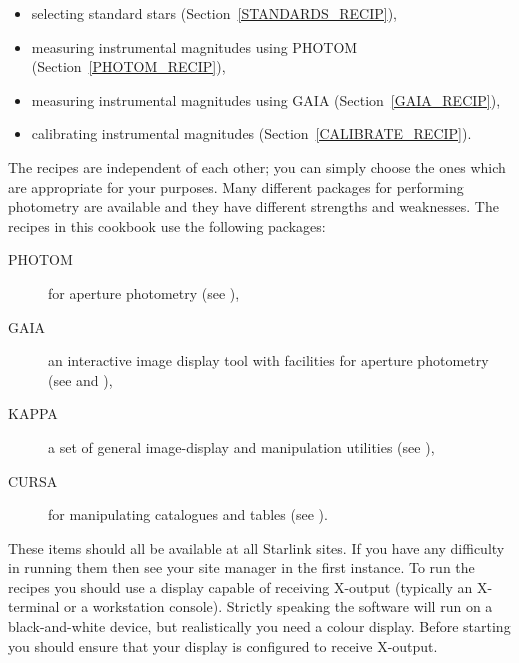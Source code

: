 \documentclass[twoside,11pt,nolof]{starlink}
\begin{document}
\begin{itemize}

  \item selecting standard stars (Section~\ref{STANDARDS_RECIP}),

  \item measuring instrumental magnitudes using PHOTOM
   (Section~\ref{PHOTOM_RECIP}),

  \item measuring instrumental magnitudes using GAIA
   (Section~\ref{GAIA_RECIP}),

  \item calibrating instrumental magnitudes
   (Section~\ref{CALIBRATE_RECIP}).

\end{itemize}

The recipes are independent of each other; you can simply choose the
ones which are appropriate for your purposes.  Many different packages
for performing photometry are available and they have different strengths
and weaknesses.  The recipes in this cookbook use the following packages:

\begin{description}

  \item[PHOTOM] for aperture photometry (see
   \cite{SUN45}),

  \item[GAIA] an interactive image display tool with facilities for
   aperture photometry (see \cite{SC17} and
   \cite{SUN214}),

  \item[KAPPA] a set of general image-display and manipulation
   utilities (see \cite{SUN95}),

  \item[CURSA] for manipulating catalogues and tables (see
   \cite{SUN190}).

\end{description}

These items should all be available at all Starlink sites.  If you
have any difficulty in running them then see your site manager in
the first instance.  To run the recipes you should use a display
capable of receiving X-output (typically an X-terminal or a workstation
console).  Strictly speaking the software will run on a black-and-white
device, but realistically you need a colour display.  Before starting
you should ensure that your display is configured to receive X-output.
\end{document}
